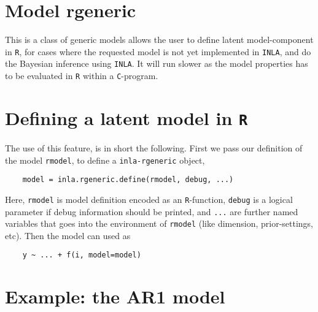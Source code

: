 \documentclass[a4paper,11pt]{article}
\begin{document}
\section*{Model \textbf{rgeneric}}

This is a class of generic models allows the user to define latent
model-component in \texttt{R}, for cases where the requested model is
not yet implemented in \texttt{INLA}, and do the Bayesian inference
using \texttt{INLA}. It will run slower as the model properties has to
be evaluated in \texttt{R} within a \texttt{C}-program.

\section*{Defining a latent model in \texttt{R}}

The use of this feature, is in short the following. First we pass our
definition of the model \texttt{rmodel}, to define a
\texttt{inla-rgeneric} object,
{\small
\begin{verbatim}
    model = inla.rgeneric.define(rmodel, debug, ...)
\end{verbatim}
} Here, \texttt{rmodel} is model definition encoded as an
\texttt{R}-function, \texttt{debug} is a logical parameter if debug
information should be printed, and \texttt{...} are further named
variables that goes into the environment of \texttt{rmodel} (like
dimension, prior-settings, etc). Then the model can used as {\small
\begin{verbatim}
    y ~ ... + f(i, model=model)
\end{verbatim}
}

\section*{Example: the AR1 model}
\end{document}

